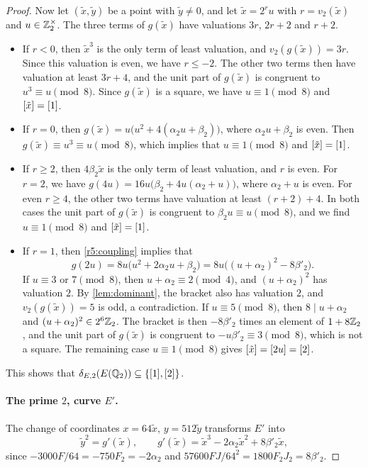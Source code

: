 \begin{proof}
Now let $(\tilde x,\tilde y)$ be a point with $\tilde y\ne0$, and let $\tilde x=2^ru$ with $r=v_2(\tilde x)$ and $u\in\mathbb Z_2^\times$. The three terms of $g(\tilde x)$ have valuations $3r$, $2r+2$ and $r+2$.
\begin{itemize}
\item If $r<0$, then $\tilde x^3$ is the only term of least valuation, and $v_2(g(\tilde x))=3r$. Since this valuation is even, we have $r\le-2$. The other two terms then have valuation at least $3r+4$, and the unit part of $g(\tilde x)$ is congruent to $u^3\equiv u\pmod 8$. Since $g(\tilde x)$ is a square, we have $u\equiv1\pmod8$ and $[\tilde x]=[1]$.
\item If $r=0$, then $g(\tilde x)=u\big(u^2+4(\alpha_2 u+\beta_2)\big)$, where $\alpha_2 u+\beta_2$ is even. Then $g(\tilde x)\equiv u^3\equiv u\pmod8$, which implies that $u\equiv1\pmod8$ and $[\tilde x]=[1]$.
\item If $r\ge2$, then $4\beta_2 \tilde x$ is the only term of least valuation, and $r$ is even. For $r=2$, we have $g(4u)=16u\big(\beta_2+4u(\alpha_2+u)\big)$, where $\alpha_2+u$ is even. For even $r\ge4$, the other two terms have valuation at least $(r+2)+4$. In both cases the unit part of $g(\tilde x)$ is congruent to $\beta_2 u\equiv u\pmod8$, and we find $u\equiv1\pmod8$ and $[\tilde x]=[1]$.
\item If $r=1$, then \eqref{r5:coupling} implies that
\[
g(2u)=8u\big(u^2+2\alpha_2 u+\beta_2\big)=8u\big((u+\alpha_2)^2-8\beta'_2\big).
\]
If $u\equiv3$ or $7\pmod8$, then $u+\alpha_2\equiv2\pmod4$, and $(u+\alpha_2)^2$ has valuation $2$. By \cref{lem:dominant}, the bracket also has valuation $2$, and $v_2(g(\tilde x))=5$ is odd, a contradiction. If $u\equiv5\pmod8$, then $8\mid u+\alpha_2$ and $(u+\alpha_2)^2\in2^6\mathbb Z_2$. The bracket is then $-8\beta'_2$ times an element of $1+8\mathbb Z_2$, and the unit part of $g(\tilde x)$ is congruent to $-u\beta'_2\equiv3\pmod8$, which is not a square. The remaining case $u\equiv1\pmod8$ gives $[\tilde x]=[2u]=[2]$.
\end{itemize}
This shows that $\delta_{E,2}(E(\mathbb Q_2))\subseteq\{[1],[2]\}$.

\paragraph{The prime $2$, curve $E'$.} The change of coordinates $x=64\tilde x$, $y=512\tilde y$ transforms $E'$ into
\[
\tilde y^2=g'(\tilde x),\qquad g'(\tilde x)=\tilde x^3-2\alpha_2 \tilde x^2+8\beta'_2 \tilde x,
\]
since $-3000F/64=-750F_2=-2\alpha_2$ and $57600FJ/64^2=1800F_2J_2=8\beta'_2$.


\end{proof}
